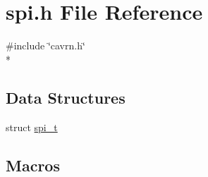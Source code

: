 \hypertarget{a00015}{\section{spi.\-h File Reference}
\label{a00015}
}
{\ttfamily \#include \char`\"{}cavrn.\-h\char`\"{}}\\*
\subsection*{Data Structures}
\begin{DoxyCompactItemize}
\item 
struct \hyperlink{a00008}{spi\-\_\-t}
\end{DoxyCompactItemize}
\subsection*{Macros}
